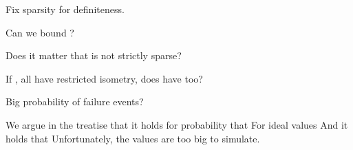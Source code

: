 {
\I Fix sparsity  for definiteness.

\I Can we bound ?

\I Does it matter that  is not strictly sparse?

\I If , all have restricted isometry, does  have too?

\I Big  probability of failure events?
}
{
\I We argue in the treatise that it holds for probability  that
%
\I For ideal values
%
\I And it holds that
%
\I Unfortunately, the values are too big to simulate.
}



